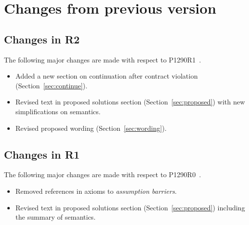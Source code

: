 \section{Changes from previous version}

\subsection{Changes in R2}

The following major changes are made with respect to P1290R1~\cite{p1290r1}.

\begin{itemize}
	\item Added a new section on continuation after contract violation (Section~\ref{sec:continue}).
	\item Revised text in proposed solutions section (Section~\ref{sec:proposed})
		with new simplifications on semantics.
	\item Revised proposed wording (Section~\ref{sec:wording}).
\end{itemize}

\subsection{Changes in R1}

The following major changes are made with respect to P1290R0~\cite{p1290r0}.

\begin{itemize}
  \item Removed references in axioms to \emph{assumption barriers}.
  \item Revised text in proposed solutions section (Section~\ref{sec:proposed})
	including the summary of semantics.
\end{itemize}
